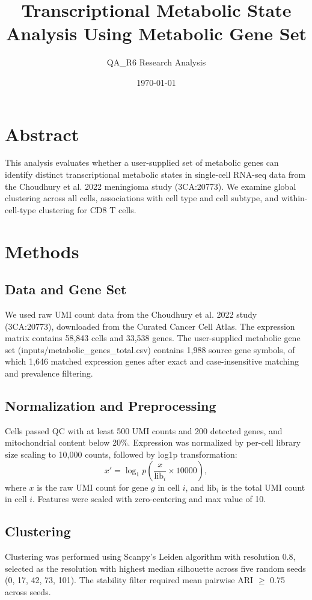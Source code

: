 \documentclass[11pt]{article}
\title{Transcriptional Metabolic State Analysis Using Metabolic Gene Set}
\author{QA\_R6 Research Analysis}
\date{\today}
\begin{document}
\maketitle

\section*{Abstract}
This analysis evaluates whether a user-supplied set of metabolic genes can identify distinct transcriptional metabolic states in single-cell RNA-seq data from the Choudhury et al. 2022 meningioma study (3CA:20773). We examine global clustering across all cells, associations with cell type and cell subtype, and within-cell-type clustering for CD8 T cells.

\section{Methods}
\subsection{Data and Gene Set}
We used raw UMI count data from the Choudhury et al. 2022 study (3CA:20773), downloaded from the Curated Cancer Cell Atlas. The expression matrix contains 58,843 cells and 33,538 genes. The user-supplied metabolic gene set (inputs/metabolic\_genes\_total.csv) contains 1,988 source gene symbols, of which 1,646 matched expression genes after exact and case-insensitive matching and prevalence filtering.

\subsection{Normalization and Preprocessing}
Cells passed QC with at least 500 UMI counts and 200 detected genes, and mitochondrial content below 20\%. Expression was normalized by per-cell library size scaling to 10,000 counts, followed by log1p transformation:
\begin{equation}
    x' = \log_1p\left(\frac{x}{\text{lib}_i} \times 10000\right),
\end{equation}
where $x$ is the raw UMI count for gene $g$ in cell $i$, and $\text{lib}_i$ is the total UMI count in cell $i$. Features were scaled with zero-centering and max value of 10.

\subsection{Clustering}
Clustering was performed using Scanpy's Leiden algorithm with resolution 0.8, selected as the resolution with highest median silhouette across five random seeds (0, 17, 42, 73, 101). The stability filter required mean pairwise ARI $\geq$ 0.75 across seeds.
\end{document}

